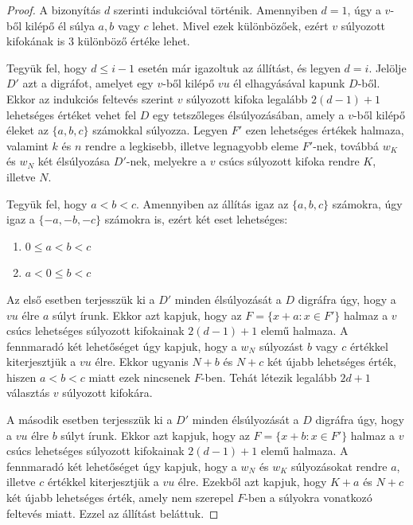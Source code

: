 \documentclass[12pt, a4paper]{report}
\theoremstyle{remark}
\theoremstyle{definition}
\begin{document}
\begin{proof}
A bizonyítás $d$ szerinti indukcióval történik. Amennyiben $d = 1$, úgy a $v$-ből kilépő él súlya $a, b$ vagy $c$ lehet. Mivel ezek különbözőek, ezért $v$ súlyozott kifokának is $3$ különböző értéke lehet.

Tegyük fel, hogy $d \leq i - 1$ esetén már igazoltuk az állítást, és legyen $d = i$. Jelölje $D'$ azt a digráfot, amelyet egy $v$-ből kilépő $vu$ él elhagyásával kapunk $D$-ből. Ekkor az indukciós feltevés szerint $v$ súlyozott kifoka legalább $2(d - 1) + 1$ lehetséges értéket vehet fel $D$ egy tetszőleges élsúlyozásában, amely a $v$-ből kilépő éleket az $\lbrace a, b, c \rbrace$ számokkal súlyozza. Legyen $F'$ ezen lehetséges értékek halmaza, valamint $k$ és $n$ rendre a legkisebb, illetve legnagyobb eleme $F'$-nek, továbbá $w_K$ és $w_N$ két élsúlyozása $D'$-nek, melyekre a $v$ csúcs súlyozott kifoka rendre $K$, illetve $N$.

Tegyük fel, hogy $a < b < c$. Amennyiben az állítás igaz az $\lbrace a, b, c \rbrace$ számokra, úgy igaz a $\lbrace -a, -b, -c \rbrace$ számokra is, ezért két eset lehetséges:

\begin{enumerate}
\item $0 \leq a < b < c$
\item $a < 0 \leq b < c$
\end{enumerate}

Az első esetben terjesszük ki a $D'$ minden élsúlyozását a $D$ digráfra úgy, hogy a $vu$ élre $a$ súlyt írunk. Ekkor azt kapjuk, hogy az $F = \lbrace x + a: x \in F' \rbrace$ halmaz a $v$ csúcs lehetséges súlyozott kifokainak $2(d - 1) + 1$ elemű halmaza. A fennmaradó két lehetőséget úgy kapjuk, hogy a $w_N$ súlyozást $b$ vagy $c$ értékkel kiterjesztjük a $vu$ élre. Ekkor ugyanis $N + b$ és $N + c$ két újabb lehetséges érték, hiszen $a < b < c$ miatt ezek nincsenek $F$-ben. Tehát létezik legalább $2d + 1$ választás $v$ súlyozott kifokára.

A második esetben terjesszük ki a $D'$ minden élsúlyozását a $D$ digráfra úgy, hogy a $vu$ élre $b$ súlyt írunk. Ekkor azt kapjuk, hogy az $F = \lbrace x + b: x \in F' \rbrace$ halmaz a $v$ csúcs lehetséges súlyozott kifokainak $2(d - 1) + 1$ elemű halmaza. A fennmaradó két lehetőséget úgy kapjuk, hogy a $w_N$ és $w_K$ súlyozásokat rendre $a$, illetve $c$ értékkel kiterjesztjük a $vu$ élre. Ezekből azt kapjuk, hogy $K + a$ és $N + c$ két újabb lehetséges érték, amely nem szerepel $F$-ben a súlyokra vonatkozó feltevés miatt. Ezzel az állítást beláttuk.
\end{proof}
\end{document}
